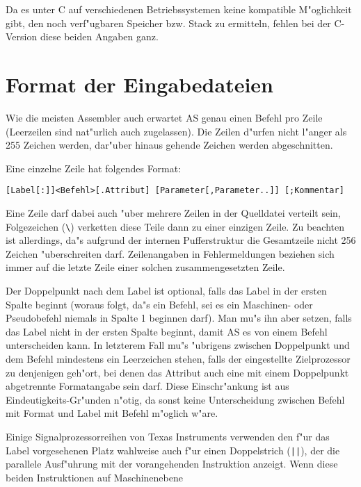 \documentclass[12pt,a4paper,twoside]{report}
\begin{document}
Da es unter C   auf verschiedenen Betriebssystemen
keine kompatible M"oglichkeit gibt, den noch verf"ugbaren Speicher bzw.
Stack zu ermitteln, fehlen bei der C-Version diese beiden Angaben ganz.


\section{Format der Eingabedateien}
\label{AttrTypes}

Wie die meisten Assembler auch erwartet AS genau einen Befehl pro Zeile
(Leerzeilen sind nat"urlich auch zugelassen).  Die Zeilen d"urfen nicht
l"anger als 255 Zeichen werden, dar"uber hinaus gehende Zeichen werden
abgeschnitten.
\par
Eine einzelne Zeile hat folgendes Format:
\begin{verbatim}
[Label[:]]<Befehl>[.Attribut] [Parameter[,Parameter..]] [;Kommentar]
\end{verbatim}
Eine Zeile darf dabei auch "uber mehrere Zeilen in der Quelldatei
verteilt sein, Folgezeichen (\verb!\!) verketten diese Teile dann zu
einer einzigen Zeile.  Zu beachten ist allerdings, da"s aufgrund der
internen Pufferstruktur die Gesamtzeile nicht 256 Zeichen "uberschreiten
darf.  Zeilenangaben in Fehlermeldungen beziehen sich immer auf die
letzte Zeile einer solchen zusammengesetzten Zeile.
\par
Der Doppelpunkt nach dem Label ist optional, falls das Label in der
ersten Spalte beginnt (woraus folgt, da"s ein Befehl, sei es ein
Maschinen- oder Pseudobefehl niemals in Spalte 1 beginnen darf).
Man mu"s ihn aber setzen, falls das Label nicht in der ersten Spalte
beginnt, damit AS es von einem Befehl unterscheiden kann.  In letzterem
Fall mu"s "ubrigens zwischen Doppelpunkt und dem Befehl mindestens ein
Leerzeichen stehen, falls der eingestellte Zielprozessor zu denjenigen
geh"ort, bei denen das Attribut auch eine mit einem Doppelpunkt
abgetrennte Formatangabe sein darf.  Diese Einschr"ankung ist aus
Eindeutigkeits-Gr"unden n"otig, da sonst keine Unterscheidung zwischen
Befehl mit Format und Label mit Befehl m"oglich w"are.
\par
Einige Signalprozessorreihen von Texas Instruments verwenden den f"ur das
Label vorgesehenen Platz wahlweise auch f"ur einen Doppelstrich
(\verb!||!), der die parallele Ausf"uhrung mit der vorangehenden
Instruktion anzeigt.  Wenn diese beiden Instruktionen auf Maschinenebene
\end{document}
